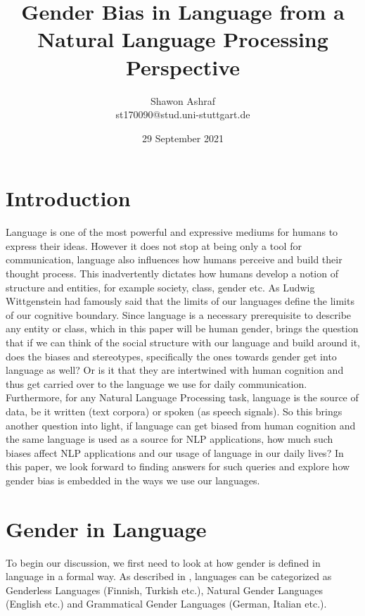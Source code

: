 \documentclass{article}
\title{Gender Bias in Language from a Natural Language Processing Perspective}
\author{Shawon Ashraf \\ st170090@stud.uni-stuttgart.de}
\date{29 September 2021}
\begin{document}
\maketitle

\section*{Introduction}
Language is one of the most powerful and expressive mediums for humans to express their ideas. However it does not stop at being only a tool for communication, language also influences how humans perceive and build their thought process. This inadvertently dictates how humans develop a notion of structure and entities, for example society, class, gender etc. As Ludwig Wittgenstein had famously said that the limits of our languages define the limits of our cognitive boundary. Since language is a necessary prerequisite to describe any entity or class, which in this paper will be human gender, brings the question that if we can think of the social structure with our language and build around it, does the biases and stereotypes, specifically the ones towards gender get into language as well? Or is it that they are intertwined with human cognition and thus get carried over to the language we use for daily communication. Furthermore, for any Natural Language Processing task, language is the source of data, be it written (text corpora) or spoken (as speech signals). So this brings another question into light, if language can get biased from human cognition and the same language is used as a source for NLP applications, how much such biases affect NLP applications and our usage of language in our daily lives? In this paper, we look forward to finding answers for such queries and explore how gender bias is embedded in the ways we use our languages.

\section*{Gender in Language}
To begin our discussion, we first need to look at how gender is defined in language in a formal way. As described in \cite{menegatti2017gender}, languages can be categorized \cite{braun2005cognitive} as Genderless Languages (Finnish, Turkish etc.), Natural Gender Languages (English etc.) and Grammatical Gender Languages (German, Italian etc.).
\end{document}
